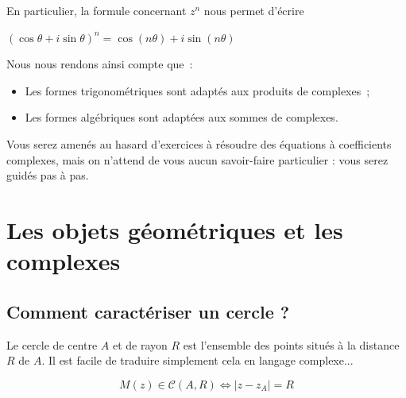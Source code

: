 \documentclass[french]{book}
\newcommand{\ab}[1]{\vert #1 \vert}
\newcommand{\calc}{\mathscr{C}}
\newcommand{\CR}{\calc}
\newcommand{\pa}[1]{(#1)}
\newcommand{\ssi}{\Longleftrightarrow}
\newcommand{\cacheg}[1]{#1}
\begin{document}
En particulier, la formule concernant $z^n$ nous permet d'écrire



  \begin{thm}
    \begin{center}
     $\pa{\cos \theta+i\sin\theta}^n= $\cacheg{$\cos(n\theta)+i\sin(n\theta)$}
    \end{center}
    \end{thm}
  



Nous nous rendons ainsi compte que~:


  \begin{rem}[]
    \begin{itemize}
\item[$\bullet$]  Les   formes  trigonométriques  sont  adaptés   aux  produits  de
  complexes~;
\item[$\bullet$] Les formes algébriques sont adaptées aux sommes de complexes.
  \end{itemize}
    \end{rem}
  






Vous  serez amenés  au hasard  d'exercices  à résoudre  des équations  à
coefficients  complexes, mais  on  n'attend de  vous aucun  savoir-faire
particulier : vous serez guidés pas à pas. 


\section{Les objets géométriques et les complexes}


\subsection{Comment caract\'eriser un cercle ?}

Le cercle de centre $A$ et de rayon $R$ est l'ensemble des points situés
à la distance  $R$ de $A$. Il est facile de  traduire simplement cela en
langage complexe... 


  \begin{rem}
    \[M(z)\in\CR(A,R)\ssi \ab{z-z_A}=R\]
    \end{rem}
  
\end{document}
